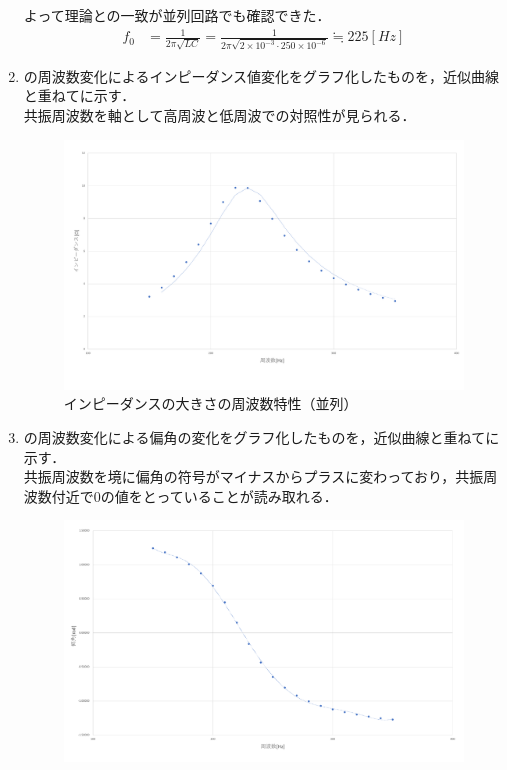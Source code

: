 \documentclass[11pt,dvipdfmx]{jarticle}
\begin{document}
\begin{enumerate}
よって理論との一致が並列回路でも確認できた．
\begin{align}
\label{eq:6}
f_0&=\frac{1}{2\pi \sqrt{LC}}=\frac{1}{2\pi \sqrt{2\times 10^{-3}\cdot 250 \times 10^{-6}}} \fallingdotseq 225[Hz]
\end{align}
\item {}の周波数変化によるインピーダンス値変化をグラフ化したものを，近似曲線と重ねてに示す．\\
共振周波数を軸として高周波と低周波での対照性が見られる．
\begin{figure}
 \centering
 \includegraphics[scale=0.45]{./fig/graph3.pdf}
 \caption{インピーダンスの大きさの周波数特性（並列）}
 \label{fig:fig8}
\end{figure}
\item {}の周波数変化による偏角の変化をグラフ化したものを，近似曲線と重ねてに示す．\\
共振周波数を境に偏角の符号がマイナスからプラスに変わっており，共振周波数付近で0の値をとっていることが読み取れる．
\begin{figure}
 \centering
 \includegraphics[scale=0.45]{./fig/graph4.pdf}

\end{figure}
\end{enumerate}
\end{document}

